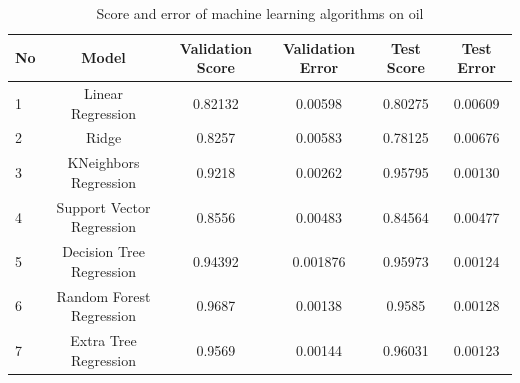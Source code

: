 \documentclass[12pt,a4paper]{report}
\begin{document}
\begin{table}[H]
\centering
\caption{Score and error of machine learning algorithms on oil}
\begin{adjustbox}{width=1\textwidth}
\small
\begin{tabular}{|l|c|c|c|c|c|}
\hline
\textbf{No} & \textbf{Model} & \textbf{Validation Score} & \textbf{Validation Error} & \textbf{Test Score} & \textbf{Test Error} \\ \hline
1           & Linear Regression                        & 0.82132                                             & 0.00598                                             & 0.80275                                       & 0.00609                                       \\ \hline
2           & Ridge                                    & 0.8257                                              & 0.00583                                             & 0.78125                                       & 0.00676                                       \\ \hline
3           & KNeighbors Regression                    & 0.9218                                              & 0.00262                                             & 0.95795                                       & 0.00130                                       \\ \hline
4           & Support Vector Regression                & 0.8556                                              & 0.00483                                             & 0.84564                                       & 0.00477                                       \\ \hline
5           & Decision Tree Regression                 & 0.94392                                             & 0.001876                                            & 0.95973                                       & 0.00124                                       \\ \hline
6           & Random Forest Regression                 & 0.9687                                              & 0.00138                                             & 0.9585                                        & 0.00128                                       \\ \hline
7           & Extra Tree Regression                    & 0.9569                                              & 0.00144                                             & 0.96031                                       & 0.00123                                       \\ \hline

\end{tabular}
\end{adjustbox}
\end{table}
\end{document}
